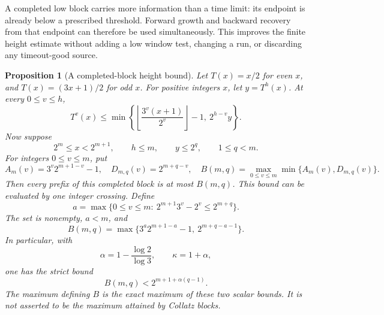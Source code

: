 \documentclass[11pt]{article}
\newtheorem{proposition}{Proposition}
\theoremstyle{remark}\newtheorem{remark}[proposition]{Remark}
\begin{document}
A completed low block carries more information than a time limit: its
endpoint is already below a prescribed threshold. Forward growth and
backward recovery from that endpoint can therefore be used simultaneously.
This improves the finite height estimate without adding a low window test,
changing a run, or discarding any timeout-good source.

\begin{proposition}[A completed-block height bound]
\label{prop:shaik-completed-block-height}
Let \(T(x)=x/2\) for even \(x\), and \(T(x)=(3x+1)/2\) for odd \(x\).
For positive integers \(x\), let \(y=T^h(x)\). At every \(0\le v\le h\),
\begin{equation}\label{eq:shaik-two-sided-block-height}
 T^v(x)\le
 \min\left\{\left\lfloor\frac{3^v(x+1)}{2^v}\right\rfloor-1,\
                        2^{h-v}y\right\}.
\end{equation}
Now suppose
\[
 2^m\le x<2^{m+1},\qquad h\le m,\qquad y\le2^q,\qquad 1\le q<m .
\]
For integers \(0\le v\le m\), put
\[
 A_m(v)=3^v2^{m+1-v}-1,\quad D_{m,q}(v)=2^{m+q-v},\quad
 B(m,q)=\max_{0\le v\le m}\min\{A_m(v),D_{m,q}(v)\}.
\]
Then every prefix of this completed block is at most \(B(m,q)\).
This bound can be evaluated by one integer crossing. Define
\begin{equation}\label{eq:shaik-height-crossing}
 a=\max\{0\le v\le m:\ 2^{m+1}3^v-2^v\le2^{m+q}\}.
\end{equation}
The set is nonempty, \(a<m\), and
\begin{equation}\label{eq:shaik-height-two-candidates}
 B(m,q)=\max\{3^a2^{m+1-a}-1,\ 2^{m+q-a-1}\}.
\end{equation}
In particular, with
\[
 \alpha=1-\frac{\log2}{\log3},\qquad \kappa=1+\alpha,
\]
one has the strict bound
\begin{equation}\label{eq:shaik-height-exponent}
 B(m,q)<2^{m+1+\alpha(q-1)}.
\end{equation}
The maximum defining \(B\) is the exact maximum of these two scalar
bounds. It is not asserted to be the maximum attained by Collatz blocks.
\end{proposition}
\end{document}
